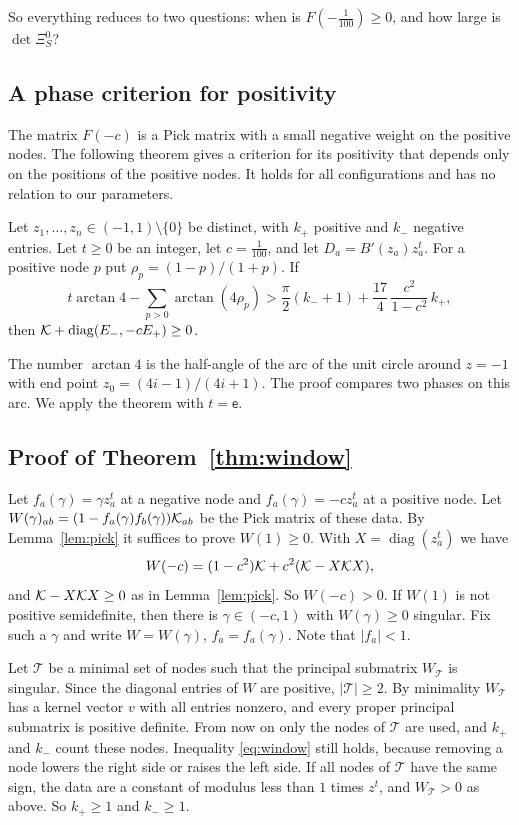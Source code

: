 So everything reduces to two questions: when is $F(-\frac1{100})\ge0$, and how large is $\det\Xi^0_S$?

\subsection{A phase criterion for positivity}\label{ssec:window}
The matrix $F(-c)$ is a Pick matrix with a small negative weight on the positive nodes. The following theorem
gives a criterion for its positivity that depends only on the positions of the positive nodes. It holds for
all configurations and has no relation to our parameters.

\begin{theorem}\label{thm:window}
Let $z_1,\ldots,z_n\in(-1,1)\setminus\{0\}$ be distinct, with $k_+$ positive and $k_-$ negative entries. Let
$t\ge0$ be an integer, let $c=\frac1{100}$, and let $D_a=B'(z_a)z_a^t$. For a positive node $p$ put
$\rho_p=(1-p)/(1+p)$. If
\begin{equation}\label{eq:window}
 t\arctan4-\sum_{p>0}\arctan(4\rho_p)>\frac{\pi}{2}(k_-+1)+\frac{17}4\,\frac{c^2}{1-c^2}\,k_+,
\end{equation}
then $\mathcal K+\operatorname{diag}(E_-,-cE_+)\ge0$.
\end{theorem}

The number $\arctan4$ is the half-angle of the arc of the unit circle around $z=-1$ with end point
$z_0=(4i-1)/(4i+1)$. The proof compares two phases on this arc. We apply the theorem with $t=\mathsf e$.

\subsection{Proof of Theorem~\ref{thm:window}}\label{ssec:windowproof}
Let $f_a(\gamma)=\gamma z_a^t$ at a negative node and $f_a(\gamma)=-cz_a^t$ at a positive node. Let
$W(\gamma)_{ab}=(1-f_a(\gamma)f_b(\gamma))\mathcal K_{ab}$ be the Pick matrix of these data. By Lemma~\ref{lem:pick} it suffices to prove
$W(1)\ge0$. With $X=\operatorname{diag}(z_a^t)$ we have
\[
 W(-c)=(1-c^2)\mathcal K+c^2(\mathcal K-X\mathcal K X),
\]
and $\mathcal K-X\mathcal K X\ge0$ as in Lemma~\ref{lem:pick}. So $W(-c)>0$. If $W(1)$ is not positive semidefinite, then there is
$\gamma\in(-c,1)$ with $W(\gamma)\ge0$ singular. Fix such a $\gamma$ and write $W=W(\gamma)$, $f_a=f_a(\gamma)$. Note that $|f_a|<1$.

Let $\mathcal T$ be a minimal set of nodes such that the principal submatrix $W_{\mathcal T}$ is singular. Since the diagonal entries of $W$ are
positive, $|\mathcal T|\ge2$. By minimality $W_{\mathcal T}$ has a kernel vector $v$ with all entries nonzero, and every proper principal
submatrix is positive definite. From now on only the nodes of $\mathcal T$ are used, and $k_+$ and $k_-$ count these nodes.
Inequality \eqref{eq:window} still holds, because removing a node lowers the right side or raises the left side. If all nodes of $\mathcal T$ have
the same sign, the data are a constant of modulus less than $1$ times $z^t$, and $W_{\mathcal T}>0$ as above. So $k_+\ge1$ and $k_-\ge1$.

